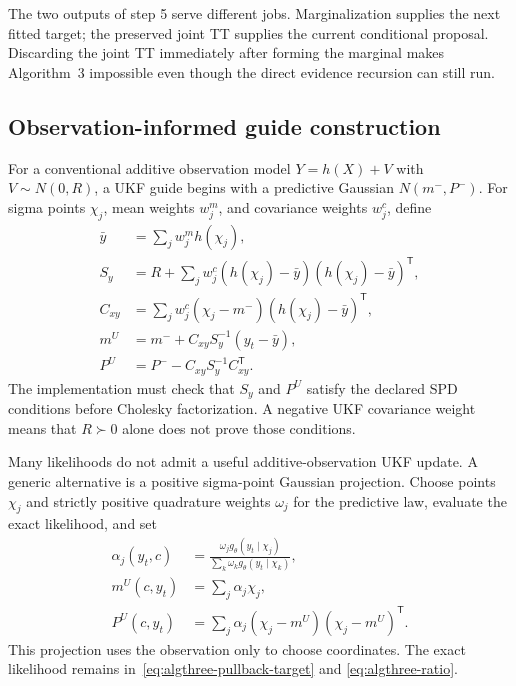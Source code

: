 \documentclass[11pt]{article}
\begin{document}
The two outputs of step 5 serve different jobs.  Marginalization supplies the
next fitted target; the preserved joint TT supplies the current conditional
proposal.  Discarding the joint TT immediately after forming the marginal
makes Algorithm~3 impossible even though the direct evidence recursion can
still run.

\subsection{Observation-informed guide construction}

For a conventional additive observation model $Y=h(X)+V$ with
$V\sim N(0,R)$, a UKF guide begins with a predictive Gaussian
$N(m^-,P^-)$.  For sigma points $\chi_j$, mean weights $w_j^m$, and covariance
weights $w_j^c$, define
\begin{align}
 \bar y&=\sum_jw_j^m h(\chi_j),\\
 S_y&=R+\sum_jw_j^c(h(\chi_j)-\bar y)(h(\chi_j)-\bar y)^\mathsf T,\\
 C_{xy}&=\sum_jw_j^c(\chi_j-m^-)(h(\chi_j)-\bar y)^\mathsf T,\\
 m^U&=m^-+C_{xy}S_y^{-1}(y_t-\bar y),\\
 P^U&=P^--C_{xy}S_y^{-1}C_{xy}^\mathsf T.
 \label{eq:algthree-ukf-update}
\end{align}
The implementation must check that $S_y$ and $P^U$ satisfy the declared SPD
conditions before Cholesky factorization.  A negative UKF covariance weight
means that $R\succ0$ alone does not prove those conditions.

Many likelihoods do not admit a useful additive-observation UKF update.  A
generic alternative is a positive sigma-point Gaussian projection.  Choose
points $\chi_j$ and strictly positive quadrature weights $\omega_j$ for the
predictive law, evaluate the exact likelihood, and set
\begin{align}
 \alpha_j(y_t,c)
 &=\frac{\omega_jg_\theta(y_t\mid\chi_j)}
         {\sum_k\omega_kg_\theta(y_t\mid\chi_k)},
 \label{eq:algthree-likelihood-weights}\\
 m^U(c,y_t)&=\sum_j\alpha_j\chi_j,\\
 P^U(c,y_t)&=\sum_j\alpha_j
  (\chi_j-m^U)(\chi_j-m^U)^\mathsf T.
 \label{eq:algthree-likelihood-projection}
\end{align}
This projection uses the observation only to choose coordinates.  The exact
likelihood remains in~\eqref{eq:algthree-pullback-target} and
\eqref{eq:algthree-ratio}.
\end{document}
